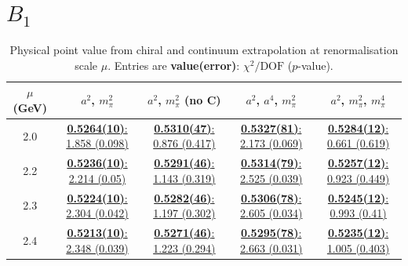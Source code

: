 \documentclass[12pt]{extarticle}
\begin{document}
\section{$B_1$}
\begin{table}[h!]
\begin{center}
\begin{tabular}{|c|c|c|c|c|}
\hline
$\mu$ (GeV) & $a^2$, $m_\pi^2$& $a^2$, $m_\pi^2$ (no C)& $a^2$, $a^4$, $m_\pi^2$& $a^2$, $m_\pi^2$, $m_\pi^4$\\
\hline
2.0& \hyperlink{VVpAA/NPR/a2m2_20.pdf.1}{\textbf{0.5264(10)}: 1.858 (0.098)} & \hyperlink{VVpAA/NPR/a2m2noC_20.pdf.1}{\textbf{0.5310(47)}: 0.876 (0.417)} & \hyperlink{VVpAA/NPR/a2a4m2_20.pdf.1}{\textbf{0.5327(81)}: 2.173 (0.069)} & \hyperlink{VVpAA/NPR/a2m2m4_20.pdf.1}{\textbf{0.5284(12)}: 0.661 (0.619)}\\
2.2& \hyperlink{VVpAA/NPR/a2m2_22.pdf.1}{\textbf{0.5236(10)}: 2.214 (0.05)} & \hyperlink{VVpAA/NPR/a2m2noC_22.pdf.1}{\textbf{0.5291(46)}: 1.143 (0.319)} & \hyperlink{VVpAA/NPR/a2a4m2_22.pdf.1}{\textbf{0.5314(79)}: 2.525 (0.039)} & \hyperlink{VVpAA/NPR/a2m2m4_22.pdf.1}{\textbf{0.5257(12)}: 0.923 (0.449)}\\
2.3& \hyperlink{VVpAA/NPR/a2m2_23.pdf.1}{\textbf{0.5224(10)}: 2.304 (0.042)} & \hyperlink{VVpAA/NPR/a2m2noC_23.pdf.1}{\textbf{0.5282(46)}: 1.197 (0.302)} & \hyperlink{VVpAA/NPR/a2a4m2_23.pdf.1}{\textbf{0.5306(78)}: 2.605 (0.034)} & \hyperlink{VVpAA/NPR/a2m2m4_23.pdf.1}{\textbf{0.5245(12)}: 0.993 (0.41)}\\
2.4& \hyperlink{VVpAA/NPR/a2m2_24.pdf.1}{\textbf{0.5213(10)}: 2.348 (0.039)} & \hyperlink{VVpAA/NPR/a2m2noC_24.pdf.1}{\textbf{0.5271(46)}: 1.223 (0.294)} & \hyperlink{VVpAA/NPR/a2a4m2_24.pdf.1}{\textbf{0.5295(78)}: 2.663 (0.031)} & \hyperlink{VVpAA/NPR/a2m2m4_24.pdf.1}{\textbf{0.5235(12)}: 1.005 (0.403)}\\
\hline
\end{tabular}
\caption{Physical point value from chiral and continuum extrapolation at renormalisation scale $\mu$. Entries are \textbf{value(error)}: $\chi^2/\text{DOF}$ ($p$-value).}
\end{center}
\end{table}
\end{document}
